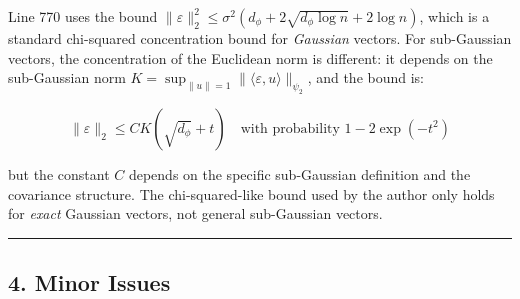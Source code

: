 \documentclass[
  12pt,
]{article}
\begin{document}
Line 770 uses the bound
\(\|\varepsilon\|_2^2 \leq \sigma^2(d_\phi + 2\sqrt{d_\phi \log n} + 2\log n)\),
which is a standard chi-squared concentration bound for \emph{Gaussian}
vectors. For sub-Gaussian vectors, the concentration of the Euclidean
norm is different: it depends on the sub-Gaussian norm
\(K = \sup_{\|u\|=1} \|\langle \varepsilon, u\rangle\|_{\psi_2}\), and
the bound is:

\[\|\varepsilon\|_2 \leq C K (\sqrt{d_\phi} + t) \quad \text{with probability } 1 - 2\exp(-t^2)\]

but the constant \(C\) depends on the specific sub-Gaussian definition
and the covariance structure. The chi-squared-like bound used by the
author only holds for \emph{exact} Gaussian vectors, not general
sub-Gaussian vectors.

\begin{center}\rule{0.5\linewidth}{0.5pt}\end{center}

\subsection{4. Minor Issues}\label{minor-issues}
\end{document}
